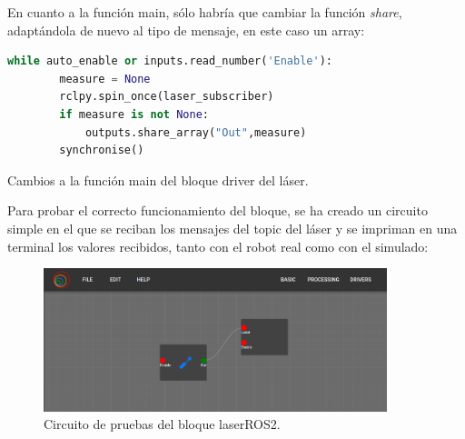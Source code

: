En cuanto a la función main, sólo habría que cambiar la función \textit{share}, adaptándola de nuevo al tipo de mensaje, en este caso un array:
\begin{code}[H]
  \begin{lstlisting}[language=python]
    while auto_enable or inputs.read_number('Enable'):
        measure = None
        rclpy.spin_once(laser_subscriber)
        if measure is not None:
            outputs.share_array("Out",measure)   
        synchronise()  
  \end{lstlisting}
  \caption[Cambios main bloque láser]{Cambios a la función main del bloque driver del láser.}
  \label{cod:laser_main_changes}
\end{code}

Para probar el correcto funcionamiento del bloque, se ha creado un circuito simple en el que se reciban los mensajes del topic del láser y se impriman
en una terminal los valores recibidos, tanto con el robot real como con el simulado:

\begin{figure} [H]
  \begin{center}
      \includegraphics[width=10cm]{figs/c4/laserC.png}
  \end{center}
  \caption[Circuito pruebas bloque láser ROS2]{Circuito de pruebas del bloque laserROS2.}
  \label{fig:laser_circuit}
\end{figure}

